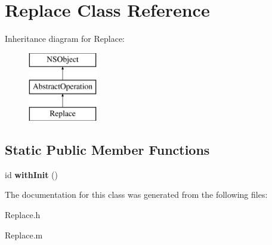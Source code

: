 \hypertarget{interface_replace}{
\section{\-Replace \-Class \-Reference}
\label{interface_replace}
}
\-Inheritance diagram for \-Replace\-:\begin{figure}[H]
\begin{center}
\leavevmode
\includegraphics[height=3.000000cm]{interface_replace}
\end{center}
\end{figure}
\subsection*{\-Static \-Public \-Member \-Functions}
\begin{DoxyCompactItemize}
\item 
\hypertarget{interface_replace_a9a17577b4a913b5852de0c437903c04e}{
id {\bfseries with\-Init} ()}
\label{interface_replace_a9a17577b4a913b5852de0c437903c04e}

\end{DoxyCompactItemize}


\-The documentation for this class was generated from the following files\-:\begin{DoxyCompactItemize}
\item 
\-Replace.\-h\item 
\-Replace.\-m\end{DoxyCompactItemize}

